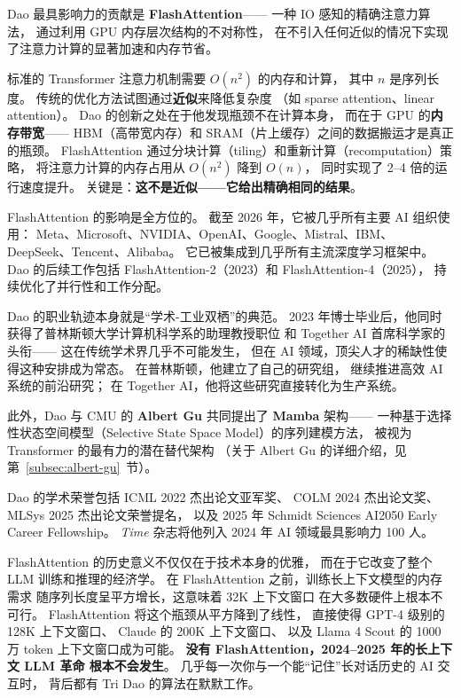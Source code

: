 Dao 最具影响力的贡献是 \textbf{FlashAttention}——
一种 IO 感知的精确注意力算法，
通过利用 GPU 内存层次结构的不对称性，
在不引入任何近似的情况下实现了注意力计算的显著加速和内存节省。

\begin{keybox}
标准的 Transformer 注意力机制需要 $O(n^2)$ 的内存和计算，
其中 $n$ 是序列长度。
传统的优化方法试图通过\textbf{近似}来降低复杂度
（如 sparse attention、linear attention）。
Dao 的创新之处在于他发现瓶颈不在计算本身，
而在于 GPU 的\textbf{内存带宽}——
HBM（高带宽内存）和 SRAM（片上缓存）之间的数据搬运才是真正的瓶颈。
FlashAttention 通过分块计算（tiling）和重新计算（recomputation）策略，
将注意力计算的内存占用从 $O(n^2)$ 降到 $O(n)$，
同时实现了 2--4 倍的运行速度提升。
关键是：\textbf{这不是近似——它给出精确相同的结果}。
\end{keybox}

FlashAttention 的影响是全方位的。
截至 2026 年，它被几乎所有主要 AI 组织使用：
Meta、Microsoft、NVIDIA、OpenAI、Google、Mistral、IBM、
DeepSeek、Tencent、Alibaba。
它已被集成到几乎所有主流深度学习框架中。
Dao 的后续工作包括 FlashAttention-2（2023）和 FlashAttention-4（2025），
持续优化了并行性和工作分配。

Dao 的职业轨迹本身就是``学术-工业双栖''的典范。
2023 年博士毕业后，他同时获得了普林斯顿大学计算机科学系的助理教授职位
和 Together AI 首席科学家的头衔——
这在传统学术界几乎不可能发生，
但在 AI 领域，顶尖人才的稀缺性使得这种安排成为常态。
在普林斯顿，他建立了自己的研究组，
继续推进高效 AI 系统的前沿研究；
在 Together AI，他将这些研究直接转化为生产系统。

此外，Dao 与 CMU 的 \textbf{Albert Gu} 共同提出了 \textbf{Mamba} 架构——
一种基于选择性状态空间模型（Selective State Space Model）的序列建模方法，
被视为 Transformer 的最有力的潜在替代架构
（关于 Albert Gu 的详细介绍，见第~\ref{subsec:albert-gu}~节）。

Dao 的学术荣誉包括 ICML 2022 杰出论文亚军奖、
COLM 2024 杰出论文奖、MLSys 2025 杰出论文荣誉提名，
以及 2025 年 Schmidt Sciences AI2050 Early Career Fellowship。
\textit{Time} 杂志将他列入 2024 年 AI 领域最具影响力 100 人。

\begin{whybox}
FlashAttention 的历史意义不仅仅在于技术本身的优雅，
而在于它改变了整个 LLM 训练和推理的经济学。
在 FlashAttention 之前，训练长上下文模型的内存需求
随序列长度呈平方增长，这意味着 32K 上下文窗口
在大多数硬件上根本不可行。
FlashAttention 将这个瓶颈从平方降到了线性，
直接使得 GPT-4 级别的 128K 上下文窗口、
Claude 的 200K 上下文窗口、
以及 Llama 4 Scout 的 1000 万 token 上下文窗口成为可能。
\textbf{没有 FlashAttention，2024--2025 年的长上下文 LLM 革命
根本不会发生}。
几乎每一次你与一个能``记住''长对话历史的 AI 交互时，
背后都有 Tri Dao 的算法在默默工作。
\end{whybox}

